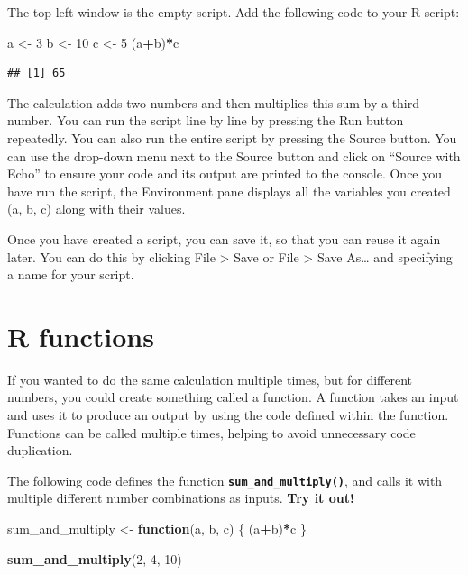 \documentclass[
]{book}
\newenvironment{Shaded}{\begin{snugshade}}{\end{snugshade}}
\newcommand{\ControlFlowTok}[1]{\textcolor[rgb]{0.13,0.29,0.53}{\textbf{#1}}}
\newcommand{\DecValTok}[1]{\textcolor[rgb]{0.00,0.00,0.81}{#1}}
\newcommand{\FunctionTok}[1]{\textcolor[rgb]{0.13,0.29,0.53}{\textbf{#1}}}
\newcommand{\NormalTok}[1]{#1}
\newcommand{\OtherTok}[1]{\textcolor[rgb]{0.56,0.35,0.01}{#1}}
\newcommand{\SpecialCharTok}[1]{\textcolor[rgb]{0.81,0.36,0.00}{\textbf{#1}}}
\begin{document}
The top left window is the empty script. Add the following code to your R script:

\begin{Shaded}
\begin{Highlighting}[]
\NormalTok{a }\OtherTok{\textless{}{-}} \DecValTok{3}
\NormalTok{b }\OtherTok{\textless{}{-}} \DecValTok{10}
\NormalTok{c }\OtherTok{\textless{}{-}} \DecValTok{5}
\NormalTok{(a}\SpecialCharTok{+}\NormalTok{b)}\SpecialCharTok{*}\NormalTok{c}
\end{Highlighting}
\end{Shaded}

\begin{verbatim}
## [1] 65
\end{verbatim}

The calculation adds two numbers and then multiplies this sum by a third number. You can run the script line by line by pressing the Run button repeatedly. You can also run the entire script by pressing the Source button. You can use the drop-down menu next to the Source button and click on ``Source with Echo'' to ensure your code and its output are printed to the console. Once you have run the script, the Environment pane displays all the variables you created (a, b, c) along with their values.

Once you have created a script, you can save it, so that you can reuse it again later. You can do this by clicking File \textgreater{} Save or File \textgreater{} Save As\ldots{} and specifying a name for your script.

\section{R functions}\label{sec:functions}

If you wanted to do the same calculation multiple times, but for different numbers, you could create something called a function. A function takes an input and uses it to produce an output by using the code defined within the function. Functions can be called multiple times, helping to avoid unnecessary code duplication.

The following code defines the function \textbf{\texttt{sum\_and\_multiply()}}, and calls it with multiple different number combinations as inputs. \textbf{Try it out!}

\begin{Shaded}
\begin{Highlighting}[]
\NormalTok{sum\_and\_multiply }\OtherTok{\textless{}{-}} \ControlFlowTok{function}\NormalTok{(a, b, c) \{}
\NormalTok{  (a}\SpecialCharTok{+}\NormalTok{b)}\SpecialCharTok{*}\NormalTok{c}
\NormalTok{\}}

\FunctionTok{sum\_and\_multiply}\NormalTok{(}\DecValTok{2}\NormalTok{, }\DecValTok{4}\NormalTok{, }\DecValTok{10}\NormalTok{)}
\end{Highlighting}
\end{Shaded}
\end{document}
